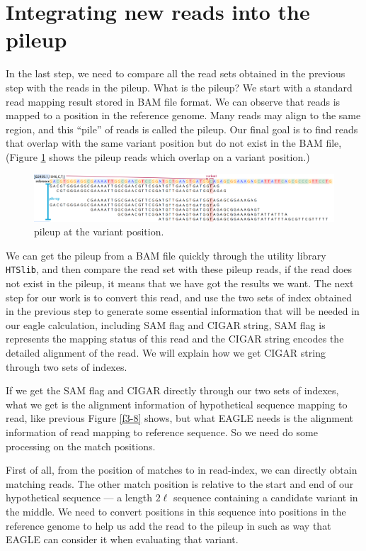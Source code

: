 \section{Integrating new reads into the pileup}
In the last step, we need to compare all the read sets obtained in the previous step with the reads in the pileup. What is the pileup?
We start with a standard read mapping result stored in BAM file format.  We can observe that reads is mapped to a position in the reference genome. Many reads may align to the same region, and this ``pile'' of reads is called the pileup. Our final goal is to find reads that overlap with the same variant position but do not exist in the BAM file, (Figure \ref{f3-9} shows the pileup reads which overlap on a variant position.)

\begin{figure}[H]
\vspace*{1em}
\includegraphics[width=1\columnwidth]{body/image/3-9.png}
\caption[pileup]{pileup at the variant position.}
\label{f3-9}
\end{figure}

We can get the pileup from a BAM file quickly through the utility library \texttt{HTSlib}, and then compare the read set with these pileup reads, if the read does not exist in the pileup, it means that we have got the results we want.  The next step for our work is to convert this read, and use the two sets of index obtained in the previous step to generate some essential information that will be needed in our eagle calculation, including SAM flag and CIGAR string, SAM flag is represents the mapping status of this read and the CIGAR string encodes the detailed alignment of the read. We will explain how we get CIGAR string through two sets of indexes.

If we get the SAM flag and CIGAR directly through our two sets of indexes, what we get is the alignment information of hypothetical sequence mapping to read, like previous Figure \ref{f3-8} shows, but what EAGLE needs is the alignment information of read mapping to reference sequence. So we need do some processing on the match positions.

First of all, from the position of matches to in read-index, we can directly obtain matching reads.  The other match position is relative to the start and end of our hypothetical sequence --- a length $2\ell$ sequence containing a candidate variant in the middle.  We need to convert positions in this sequence into positions in the reference genome to help us add the read to the pileup in such as way that EAGLE can consider it when evaluating that variant.

